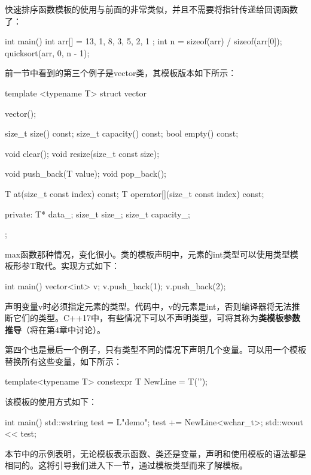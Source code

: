 快速排序函数模板的使用与前面的非常类似，并且不需要将指针传递给回调函数了：

\begin{cppcode}
int main()
{
	int arr[] = { 13, 1, 8, 3, 5, 2, 1 };
	int n = sizeof(arr) / sizeof(arr[0]);
	quicksort(arr, 0, n - 1);
}
\end{cppcode}

前一节中看到的第三个例子是vector类，其模板版本如下所示：

\begin{cppcode}
template <typename T>
struct vector
{
	vector();
	
	size_t size() const;
	size_t capacity() const;
	bool empty() const;
	
	void clear();
	void resize(size_t const size);
	
	void push_back(T value);
	void pop_back();
	
	T at(size_t const index) const;
	T operator[](size_t const index) const;
	
private:
	T* data_;
	size_t size_;
	size_t capacity_;
};
\end{cppcode}

max函数那种情况，变化很小。类的模板声明中，元素的int类型可以使用类型模板形参T取代。实现方式如下：

\begin{cppcode}
int main()
{
	vector<int> v;
	v.push_back(1);
	v.push_back(2);
}
\end{cppcode}

声明变量v时必须指定元素的类型。代码中，v的元素是int，否则编译器将无法推断它们的类型。C++17中，有些情况下可以不声明类型，可将其称为\textbf{类模板参数推导}（将在第4章中讨论）。

第四个也是最后一个例子，只有类型不同的情况下声明几个变量。可以用一个模板替换所有这些变量，如下所示：

\begin{cppcode}
template<typename T>
constexpr T NewLine = T('\n');
\end{cppcode}

该模板的使用方式如下：

\begin{cppcode}
int main()
{
	std::wstring test = L"demo";
	test += NewLine<wchar_t>;
	std::wcout << test;
}
\end{cppcode}

本节中的示例表明，无论模板表示函数、类还是变量，声明和使用模板的语法都是相同的。这将引导我们进入下一节，通过模板类型而来了解模板。














